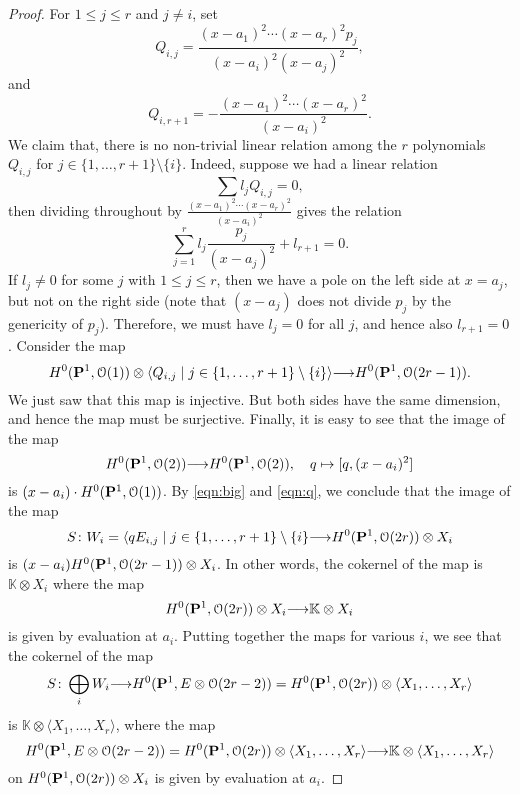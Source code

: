\documentclass[11pt,reqno]{amsart}
\theoremstyle{plain}
\theoremstyle{definition}
\theoremstyle{remark}
\numberwithin{equation}{section}
\renewcommand{\k}{\mathbb{K}}
\renewcommand{\to}{{\longrightarrow}}
\numberwithin{equation}{section}
\renewcommand{\O}{\mathcal O}
\begin{document}
\begin{proof}
  For $1 \leq j \leq r$ and $j \neq i$, set
  \[
    Q_{i,j} = \frac{(x-a_1)^2 \cdots (x-a_r)^2p_j}{(x-a_i)^2(x-a_j)^2}, 
  \]
  and
  \[
    Q_{i,r+1} = - \frac{(x-a_1)^2 \cdots (x-a_r)^2}{(x-a_i)^2}.
  \]
  We claim that, there is no non-trivial linear relation among the $r$ polynomials $Q_{i,j}$ for $j \in \{1, \dots, r+1\} \setminus \{i\}$.
  Indeed, suppose we had a linear relation
  \[ \sum l_j Q_{i,j} = 0,\]
  then dividing throughout by $\frac{(x-a_1)^2\cdots (x-a_r)^2}{(x-a_i)^2}$ gives the relation
  \[ \sum_{j = 1}^r l_j \frac{p_j}{(x-a_j)^2} + l_{r+1} = 0.\]
  If $l_j \neq 0$ for some $j$ with $1 \leq j \leq r$, then we have a pole on the left side at $x = a_j$, but not on the right side (note that $(x-a_j)$ does not divide $p_j$ by the genericity of $p_j$).
  Therefore, we must have $l_j = 0$ for all $j$, and hence also $l_{r+1} = 0$.
  Consider the map
  \begin{equation}\label{eqn:big}
    H^0(\P^1, \O(1)) \otimes \langle  Q_{i,j} \mid j \in \{1, \dots, r+1\} \setminus \{i\}\rangle \to H^0(\P^1, \O(2r-1)).
  \end{equation}
  We just saw that this map is injective.
  But both sides have the same dimension, and hence the map must be surjective.
  Finally, it is easy to see that the image of the map
  \begin{equation}\label{eqn:q}
    H^0(\P^1, \O(2)) \to H^0(\P^1, \O(2)), \quad q \mapsto [q, (x-a_i)^2]
  \end{equation}
  is $(x-a_i)\cdot H^0(\P^1, \O(1))$.
  By \eqref{eqn:big} and \eqref{eqn:q}, we conclude that the image of the map
  \[ S \from W_i = \langle qE_{i,j} \mid j \in\{1, \dots, r+1\} \setminus \{i\} \to H^0(\P^1, \O(2r)) \otimes X_i\]
  is $(x-a_i)H^0(\P^1, \O(2r-1)) \otimes X_i$.
  In other words, the cokernel of the map is $\k \otimes X_i$ where the map
  \[H^0(\P^1, \O(2r)) \otimes X_i \to \k \otimes X_i \]
  is given by evaluation at $a_i$.
  Putting together the maps for various $i$, we see that the cokernel of the map
  \[ S \from \bigoplus_i W_i \to H^0(\P^1, E \otimes \O(2r-2)) = H^0(\P^1, \O(2r)) \otimes \langle  X_1, \dots, X_r \rangle\]
  is $\k \otimes \langle  X_1, \dots, X_r \rangle$, where the map
  \begin{equation}\label{eqn:partialsur}
    H^0(\P^1, E \otimes \O(2r-2)) = H^0(\P^1, \O(2r)) \otimes \langle  X_1, \dots, X_r \rangle \to \k \otimes \langle  X_1, \dots, X_r \rangle
  \end{equation}
  on $H^0(\P^1, \O(2r)) \otimes X_i$ is given by evaluation at $a_i$.


\end{proof}
\end{document}
